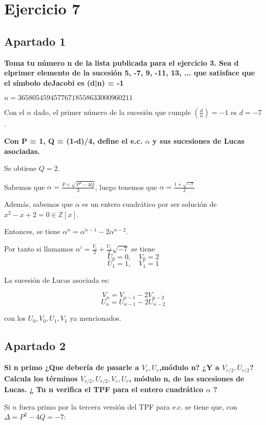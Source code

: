\documentclass[a4paper]{article}
\title {\fbox{\Huge{\textbf{Ejercicio 7}}}}
\author {\fbox{Ana Buendía Ruiz-Azuaga}}
\begin{document}
\maketitle


\section{Ejercicio 7}

\subsection{Apartado 1}

\textbf{Toma tu número n de la lista publicada para el ejercicio 3. Sea d elprimer elemento de la sucesión 5, -7, 9, -11, 13, ... que satisface que el símbolo deJacobi es (d|n) = -1}

$n = 36580545945776718558633000960211$

Con el $n$ dado, el primer número de la sucesión que cumple $\left( \frac{d}{n} \right)=-1$ es $d=-7$.

\textbf{Con P = 1, Q = (1-d)/4, define el e.c. $\alpha$ y sus sucesiones de Lucas asociadas.}

Se obtiene $Q=2$.

Sabemos que $\alpha = \frac{P+\sqrt{P^2-4Q}}{2}$, luego tenemos que $\alpha = \frac{1+\sqrt{-7}}{2}$

Además, sabemos que $\alpha$ es un entero cuadrático por ser solución de $x^2-x+2=0 \in \mathbb{Z}[x]$.

Entonces, se tiene $\alpha^n = \alpha^{n-1}-2\alpha^{n-2}$.

Por tanto si llamamos $\alpha^{i}=\frac{V_i}{2}+\frac{U_i}{2}\sqrt{-7}$ se tiene 
$$U_0=0, \quad V_0=2$$
$$U_1=1, \quad V_1=1$$

La sucesión de Lucas asociada es:

$$V_n=V_{n-1}-2V_{n-2}$$
$$U_n=U_{n-1}-2U_{n-2}$$

con los $U_0, V_0, U_1, V_1$ ya mencionados.

\subsection{Apartado 2}
\textbf{Si n primo ¿Que debería de pasarle a $V_r,U_r$,módulo n? ¿Y a $V_{r/2} ,U_{r/2}$? Calcula los términos $V_{r/2} ,U_{r/2},V_r ,U_r$, módulo n, de las sucesiones de Lucas. ¿ Tu n verifica el TPF para el entero cuadrático $\alpha$ ?}

Si $n$ fuera primo por la tercera versión del TPF para e.c. se tiene que, con $\Delta = P^2-4Q=-7$:
\end{document}

